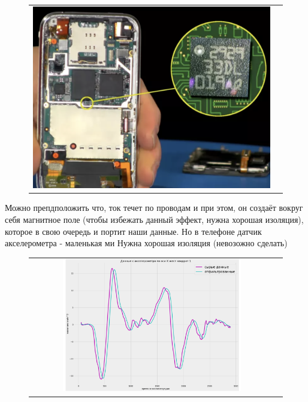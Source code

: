 \begin{figure}[H]
    \begin{center}
        \begin{tabular}{cc}
            \includegraphics[width=1\textwidth]{farim/im2} & 
        \end{tabular}
    \end{center}
\end{figure}
Можно препдположить что, 
ток течет по проводам и при этом, он создаёт вокруг себя магнитное поле 
(чтобы избежать данный эффект, нужна хорошая изоляция),
которое в свою очередь и портит наши данные.
Но в телефоне датчик акселерометра - маленькая ми
Нужна хорошая изоляция (невозожно сделать)
\begin{figure}[H]
    \begin{center}
        \begin{tabular}{cc}
            \includegraphics[width=0.75\textwidth]{farim/squares} & 
        \end{tabular}
    \end{center}
\end{figure}
